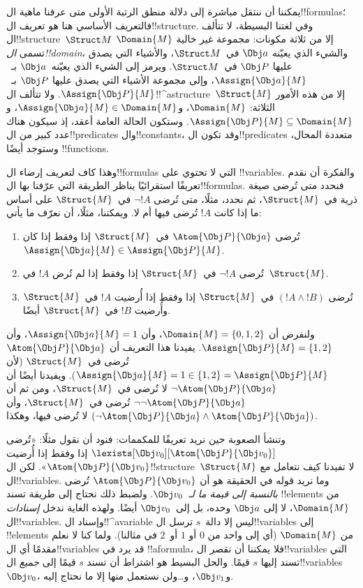 \documentclass[../../../include/open-logic-section]{subfiles}
\begin{document}


يمكننا أن ننتقل مباشرة إلى دلالة منطق الرتبة الأولى متى عرفنا ماهية
ال!!{formula}s؛ فالتعريف الأساسي هنا هو تعريف ال!!{structure}. وفي
لغتنا البسيطة، لا تتألف ال!!{structure}~$\Struct M$ إلا من ثلاثة
مكونات: مجموعة غير خالية $\Domain{M}$ تسمى \emph{ال!!{domain}}،
والشيء الذي يعيّنه $\Obj a$ في~$\Struct M$، والأشياء التي يصدق عليها
$\Obj P$ في~$\Struct M$. ويرمز إلى الشيء الذي يعيّنه~$\Obj a$
بـ~$\Assign{\Obj a}{M}$، وإلى مجموعة الأشياء التي يصدق عليها
$\Obj P$ بـ~$\Assign{\Obj P}{M}$. ولا تتألف
ال!!^a{structure}~$\Struct{M}$ إلا من هذه الأمور الثلاثة:
$\Domain{M}$، و$\Assign{\Obj a}{M} \in \Domain{M}$، و
$\Assign{\Obj P}{M} \subseteq \Domain{M}$. وستكون الحالة العامة أعقد،
إذ سيكون هناك عدد كبير من ال!!{predicate}s وال!!{constant}s، وقد تكون
ال!!{predicate}s متعددة المحال، وستوجد أيضًا !!{function}s.

وهذا كاف لتعريف إرضاء ال!!{formula}s التي لا تحتوي على
!!{variable}s. والفكرة أن نقدم تعريفًا استقرائيًا يناظر الطريقة التي
عرّفنا بها ال!!{formula}s. فنحدد متى تُرضى صيغة ذرية
في~$\Struct{M}$، ثم نحدد، مثلًا، متى تُرضى $\lnot !A$
في~$\Struct{M}$ على أساس ما إذا كانت $!A$ تُرضى فيها أم لا. ويمكننا،
مثلًا، أن نعرّف ما يأتي:
\begin{enumerate}
  \item تُرضى $\Atom{\Obj P}{\Obj a}$ في~$\Struct{M}$ إذا وفقط إذا
  كان $\Assign{\Obj a}{M} \in \Assign{\Obj P}{M}$.
  \item تُرضى $\lnot !A$ في~$\Struct{M}$ إذا وفقط إذا لم تُرض
  $!A$ في~$\Struct{M}$.
  \item تُرضى $(!A \land !B)$ في~$\Struct{M}$ إذا وفقط إذا أُرضيت
  $!A$ في~$\Struct{M}$ وأُرضيت $!B$ في~$\Struct{M}$ أيضًا.
\end{enumerate}
ولنفرض أن $\Domain{M} = \{0, 1, 2\}$، وأن
$\Assign{\Obj a}{M} = 1$، وأن
$\Assign{\Obj P}{M} = \{1, 2\}$. يفيدنا هذا التعريف أن
$\Atom{\Obj P}{\Obj a}$ تُرضى في~$\Struct{M}$ (لأن
$\Assign{\Obj a}{M} =  1 \in \{1,2\} = \Assign{\Obj P}{M}$). ويفيدنا
أيضًا أن $\lnot \Atom{\Obj P}{\Obj a}$ لا تُرضى في~$\Struct{M}$،
ومن ثم أن $\lnot\lnot \Atom{\Obj P}{\Obj a}$ تُرضى في~$\Struct{M}$، وأن
$(\lnot \Atom{\Obj P}{\Obj a} \land \Atom{\Obj P}{\Obj a})$ لا
تُرضى فيها، وهكذا.

وتنشأ الصعوبة حين نريد تعريفًا للمكممات: فنود أن نقول مثلًا:
«تُرضى $\lexists[\Obj v_0][\Atom{\Obj P}{\Obj v_0}]$ إذا وفقط إذا
أُرضيت $\Atom{\Obj P}{\Obj v_0}$». لكن ال!!{structure}~$\Struct{M}$
لا تفيدنا كيف نتعامل مع ال!!{variable}s. وما نريد قوله في الحقيقة هو
أن $\Atom{\Obj P}{\Obj v_0}$ تُرضى \emph{بالنسبة إلى قيمة ما
لـ~$\Obj v_0$}. ولضبط ذلك نحتاج إلى طريقة تسند !!{element}s من
$\Domain{M}$، لا إلى $\Obj a$ وحده، بل إلى~$\Obj v_0$ أيضًا. ولهذه
الغاية ندخل \emph{إسنادات} ال!!{variable}s. وإسناد ال!!^a{variable}
ليس إلا دالة~$s$ ترسل ال!!{variable}s إلى !!{element}s من
$\Domain{M}$ (أي إلى واحد من $0$ أو $1$ أو~$2$ في مثالنا). ولما كنا
لا نعلم مقدمًا أي ال!!{variable}s قد يرد في !!a{formula}، فلا يمكننا
أن نقصر ال!!{variable}s التي تسند إليها $s$ قيمًا. والحل البسيط هو
اشتراط أن تسند $s$ قيمًا إلى \emph{جميع} ال!!{variable}s
$\Obj v_0$، و$\Obj v_1$، و\dots\@ ولن نستعمل منها إلا ما نحتاج إليه.
\end{document}
